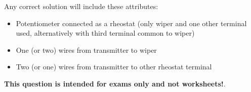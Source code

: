 Any correct solution will include these attributes:

\begin{itemize}
\item{} Potentiometer connected as a rheostat (only wiper and one other terminal used, alternatively with third terminal common to wiper)
\item{} One (or two) wires from transmitter to wiper
\item{} Two (or one) wires from transmitter to other rheostat terminal
\end{itemize}







{\bf This question is intended for exams only and not worksheets!}.



